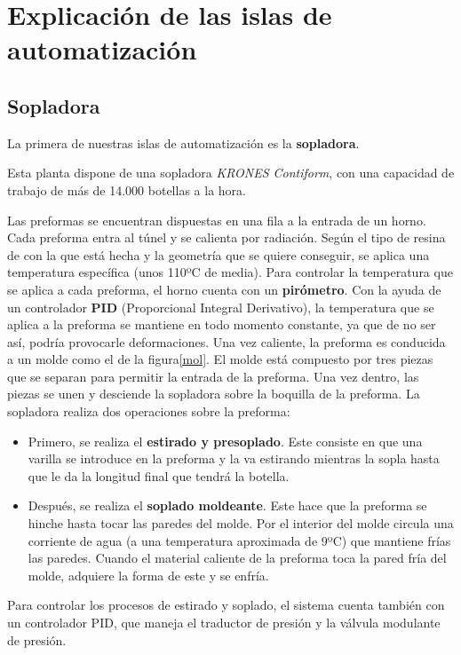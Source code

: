 \documentclass[11pt,a4paper,spanish,twoside]{report}
\begin{document}
\chapter{Explicación de las islas de automatización}
\section{Sopladora}
La primera de nuestras islas de automatización es la \textbf{sopladora}.

Esta planta dispone de una sopladora \emph{KRONES Contiform}, con una 
capacidad de trabajo de más de 14.000 botellas a la hora.

Las preformas se encuentran dispuestas en una fila a la entrada de un horno. 
Cada preforma entra al túnel y se calienta por radiación. Según el tipo de 
resina de con la que está hecha y la geometría que se quiere conseguir, se 
aplica una temperatura específica (unos 110ºC de media). Para controlar la 
temperatura que se aplica a cada preforma, el horno cuenta con un 
\textbf{pirómetro}. Con la ayuda de un controlador \textbf{PID} (Proporcional
Integral Derivativo), la temperatura que se aplica a la preforma se mantiene
en todo momento constante, ya que de no ser así, podría provocarle
deformaciones.
Una vez caliente, la preforma es conducida a un molde como el de la
figura\ref{mol}. El molde está compuesto por tres piezas que se separan
para permitir la entrada de la preforma. Una vez dentro, las piezas se unen y
desciende la sopladora sobre la boquilla de la preforma. La sopladora realiza
dos operaciones sobre la preforma: 
\begin{itemize}
\item Primero, se realiza el \textbf{estirado y presoplado}. Este consiste en
que una varilla se introduce en la preforma y la va estirando mientras la 
sopla hasta que le da la longitud final que tendrá la botella.
\item Después, se realiza el \textbf{soplado moldeante}. Este hace que la 
preforma se hinche hasta tocar las paredes del molde. Por el interior del
molde circula una corriente de agua (a una temperatura aproximada de 9ºC) que
mantiene frías las paredes. Cuando el material caliente de la preforma toca la
pared fría del molde, adquiere la forma de este y se enfría.
\end{itemize}
Para controlar los procesos de estirado y soplado, el sistema cuenta también 
con un controlador PID, que maneja el traductor de presión y la válvula 
modulante de presión.
\end{document}
